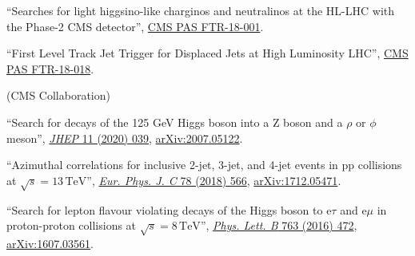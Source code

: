 \begin{description}[leftmargin=12pt,font=\normalfont\textit]
\begin{description}[leftmargin=12pt,font=\normalfont,labelsep=0em]
\item ``Searches for light higgsino-like charginos and neutralinos at the HL-LHC with the Phase-2 CMS detector'', \href{https://cds.cern.ch/record/2648538}{CMS PAS FTR-18-001}.
\item ``First Level Track Jet Trigger for Displaced Jets at High Luminosity LHC'', \href{https://cds.cern.ch/record/2647987}{CMS PAS FTR-18-018}.
\end{description}
\ifdefined\longflag
\item[FNAL institutional review leader:] (CMS Collaboration)
\begin{description}[leftmargin=12pt,font=\normalfont,labelsep=0em]
\item ``Search for decays of the 125 GeV Higgs boson into a Z boson and a $\rho$ or $\phi$ meson'', \href{https://doi.org/10.1007/JHEP11(2020)039}{\emph{JHEP} 11 (2020) 039}, \href{https://arxiv.org/abs/2007.05122}{arXiv:2007.05122}.
\item ``Azimuthal correlations for inclusive 2-jet, 3-jet, and 4-jet events in pp collisions at $\sqrt{s} = 13\,\text{TeV}$'', \href{http://dx.doi.org/10.1140/epjc/s10052-018-6033-4}{\emph{Eur. Phys. J. C} 78 (2018) 566}, \href{http://arxiv.org/abs/1712.05471}{arXiv:1712.05471}.
\item ``Search for lepton flavour violating decays of the Higgs boson to e$\tau$ and e$\mu$ in proton-proton collisions at $\sqrt{s} = 8\,\text{TeV}$'', \href{http://dx.doi.org/10.1016/j.physletb.2016.09.062}{\emph{Phys. Lett. B} 763 (2016) 472}, \href{http://arxiv.org/abs/1607.03561}{arXiv:1607.03561}.
\end{description}
\fi
\end{description}